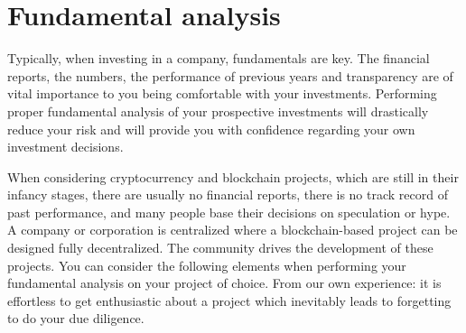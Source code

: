    

\section{Fundamental analysis}
\label{sec:fundamentalanalysis}

Typically, when investing in a company, fundamentals are key. The financial reports, the numbers, the performance of previous years and transparency are of vital importance to you being comfortable with your investments. Performing proper fundamental analysis of your prospective investments will drastically reduce your risk and will provide you with confidence regarding your own investment decisions.\medskip

When considering cryptocurrency and blockchain projects, which are still in their infancy stages, there are usually no financial reports, there is no track record of past performance, and many people base their decisions on speculation or hype. A company or corporation is centralized where a blockchain-based project can be designed fully decentralized. The community drives the development of these projects. You can consider the following elements when performing your fundamental analysis on your project of choice. From our own experience: it is effortless to get enthusiastic about a project which inevitably leads to forgetting to do your due diligence.

